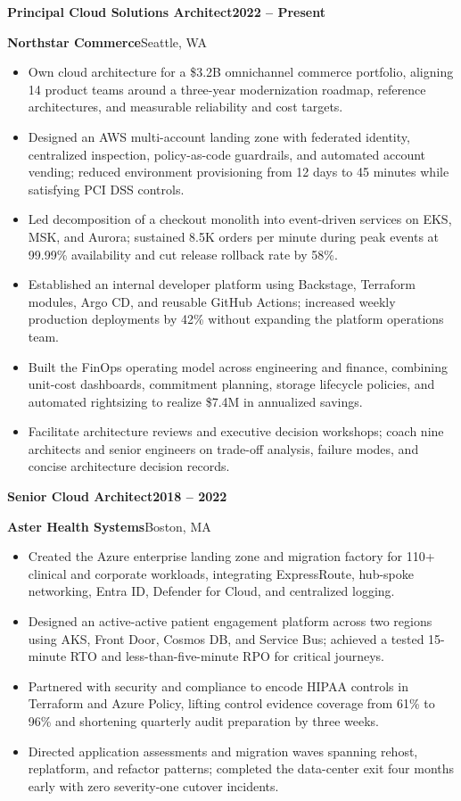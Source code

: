 \documentclass[10pt,a4paper]{article}
\newcommand{\job}[4]{%
  \Needspace*{7\baselineskip}%
  \vspace{2pt}%
  {\large\bfseries\color{navy}#1}\hfill{\small\bfseries\color{ink}#2}\par
  {\color{blue}\bfseries #3}\hfill{\small\color{muted}\faMapMarker*\enspace #4}\par
}
\begin{document}
\job{Principal Cloud Solutions Architect}{2022 -- Present}{Northstar Commerce}{Seattle, WA}
\begin{itemize}
  \item Own cloud architecture for a \$3.2B omnichannel commerce portfolio, aligning 14 product teams around a three-year modernization roadmap, reference architectures, and measurable reliability and cost targets.
  \item Designed an AWS multi-account landing zone with federated identity, centralized inspection, policy-as-code guardrails, and automated account vending; reduced environment provisioning from 12 days to 45 minutes while satisfying PCI DSS controls.
  \item Led decomposition of a checkout monolith into event-driven services on EKS, MSK, and Aurora; sustained 8.5K orders per minute during peak events at 99.99\% availability and cut release rollback rate by 58\%.
  \item Established an internal developer platform using Backstage, Terraform modules, Argo CD, and reusable GitHub Actions; increased weekly production deployments by 42\% without expanding the platform operations team.
  \item Built the FinOps operating model across engineering and finance, combining unit-cost dashboards, commitment planning, storage lifecycle policies, and automated rightsizing to realize \$7.4M in annualized savings.
  \item Facilitate architecture reviews and executive decision workshops; coach nine architects and senior engineers on trade-off analysis, failure modes, and concise architecture decision records.
\end{itemize}

\job{Senior Cloud Architect}{2018 -- 2022}{Aster Health Systems}{Boston, MA}
\begin{itemize}
  \item Created the Azure enterprise landing zone and migration factory for 110+ clinical and corporate workloads, integrating ExpressRoute, hub-spoke networking, Entra ID, Defender for Cloud, and centralized logging.
  \item Designed an active-active patient engagement platform across two regions using AKS, Front Door, Cosmos DB, and Service Bus; achieved a tested 15-minute RTO and less-than-five-minute RPO for critical journeys.
  \item Partnered with security and compliance to encode HIPAA controls in Terraform and Azure Policy, lifting control evidence coverage from 61\% to 96\% and shortening quarterly audit preparation by three weeks.
  \item Directed application assessments and migration waves spanning rehost, replatform, and refactor patterns; completed the data-center exit four months early with zero severity-one cutover incidents.
\end{itemize}
\end{document}
